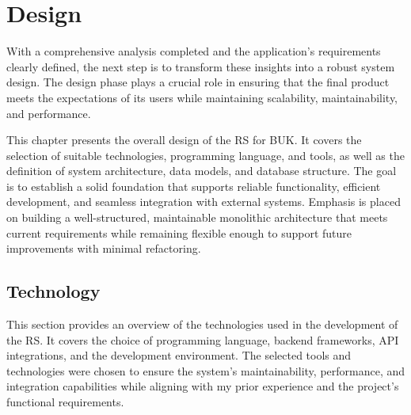 
\chapter{Design}

With a comprehensive analysis completed and the application’s requirements clearly defined, the next step is to transform these insights into a robust system design. The design phase plays a crucial role in ensuring that the final product meets the expectations of its users while maintaining scalability, maintainability, and performance.

This chapter presents the overall design of the RS for BUK. It covers the selection of suitable technologies, programming language, and tools, as well as the definition of system architecture, data models, and database structure. The goal is to establish a solid foundation that supports reliable functionality, efficient development, and seamless integration with external systems. Emphasis is placed on building a well-structured, maintainable monolithic architecture that meets current requirements while remaining flexible enough to support future improvements with minimal refactoring.

\section{Technology}

This section provides an overview of the technologies used in the development of the RS. It covers the choice of programming language, backend frameworks, API integrations, and the development environment. The selected tools and technologies were chosen to ensure the system's maintainability, performance, and integration capabilities while aligning with my prior experience and the project's functional requirements.

